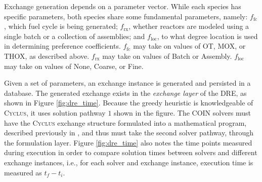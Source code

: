 \documentclass{anstrans}
\newcommand{\Cyclus}{\textsc{Cyclus}}
\newcommand{\ffc}{$f_{\text{fc}}$\xspace}
\newcommand{\frx}{$f_{\text{rx}}$\xspace}
\newcommand{\floc}{$f_{\text{loc}}$\xspace}
\begin{document}
Exchange generation depends on a parameter vector. While each species has
specific parameters, both species share some fundamental parameters, namely:
\ffc, which fuel cycle is being generated; \frx, whether reactors are modeled
using a single batch or a collection of assemblies; and \floc, to what degree
location is used in determining preference coefficients. \ffc may take on values
of OT, MOX, or THOX, as described above. \frx may take on values of Batch or
Assembly. \floc may take on values of None, Coarse, or Fine.


Given a set of parameters, an exchange instance is generated and persisted in a
database. The generated exchange exists in the \textit{exchange layer} of the
DRE, as shown in Figure \ref{fig:dre_time}. Because the greedy heuristic is
knowledgeable of \Cyclus, it uses solution pathway $1$ shown in the figure. The
COIN solvers must have the \Cyclus{} exchange structure formulated into a
mathematical program, described previously in \cite{gidden_agent-based_2013},
and thus must take the second solver pathway, through the formulation
layer. Figure \ref{fig:dre_time} also notes the time points measured during
execution in order to compare solution times between solvers and different
exchange instances, i.e., for each solver and exchange instance, execution time
is measured as $t_f - t_i$.
\end{document}
